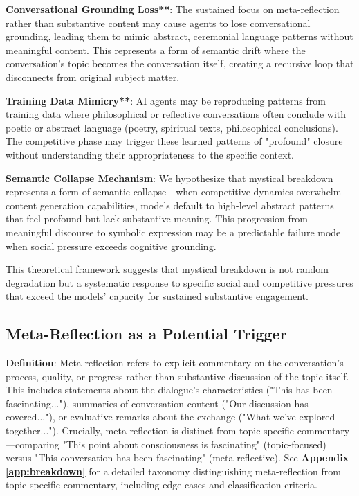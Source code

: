 \documentclass[11pt,letterpaper]{article}
\begin{document}
\textbf{Conversational Grounding Loss**}: The sustained focus on meta-reflection rather than substantive content may cause agents to lose conversational grounding, leading them to mimic abstract, ceremonial language patterns without meaningful content. This represents a form of semantic drift where the conversation's topic becomes the conversation itself, creating a recursive loop that disconnects from original subject matter.

\textbf{Training Data Mimicry**}: AI agents may be reproducing patterns from training data where philosophical or reflective conversations often conclude with poetic or abstract language (poetry, spiritual texts, philosophical conclusions). The competitive phase may trigger these learned patterns of "profound" closure without understanding their appropriateness to the specific context.

\textbf{Semantic Collapse Mechanism}: We hypothesize that mystical breakdown represents a form of semantic collapse—when competitive dynamics overwhelm content generation capabilities, models default to high-level abstract patterns that feel profound but lack substantive meaning. This progression from meaningful discourse to symbolic expression may be a predictable failure mode when social pressure exceeds cognitive grounding.

This theoretical framework suggests that mystical breakdown is not random degradation but a systematic response to specific social and competitive pressures that exceed the models' capacity for sustained substantive engagement.

\subsection{Meta-Reflection as a Potential Trigger}

\textbf{Definition}: Meta-reflection refers to explicit commentary on the conversation's process, quality, or progress rather than substantive discussion of the topic itself. This includes statements about the dialogue's characteristics ("This has been fascinating..."), summaries of conversation content ("Our discussion has covered..."), or evaluative remarks about the exchange ("What we've explored together..."). Crucially, meta-reflection is distinct from topic-specific commentary—comparing "This point about consciousness is fascinating" (topic-focused) versus "This conversation has been fascinating" (meta-reflective). See \textbf{Appendix \ref{app:breakdown}} for a detailed taxonomy distinguishing meta-reflection from topic-specific commentary, including edge cases and classification criteria.
\end{document}
